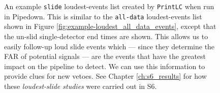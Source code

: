\begin{figure}[p]
\label{fig:example-loudest_slide_events}
\center
{}
\caption{An example \texttt{slide} loudest-events list created by
\texttt{PrintLC} when run in Pipedown. This is similar to the \texttt{all-data}
loudest-events list shown in Figure \ref{fig:example-loudest_all_data_events},
except that the un-slid single-detector end times are shown. This allows us to
easily follow-up loud slide events which --- since they determine the FAR
of potential signals --- are the events that have the greatest impact on the
pipeline to detect. We can use this information to provide clues for new
vetoes. See Chapter \ref{ch:s6_results} for how these \emph{loudest-slide
studies} were carried out in S6.}
\end{figure}

